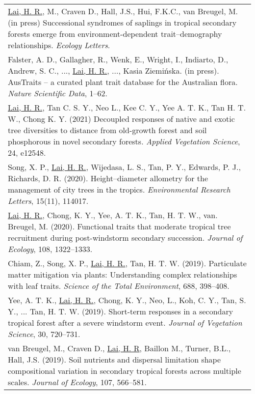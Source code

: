 \documentclass[a4paper]{article}
\begin{document}
\begin{tabular}{p{\linewidth}}

\hangindent=1cm \underline{Lai, H. R.}, M., Craven D., Hall, J.S., Hui, F.K.C., van Breugel, M. (in press) Successional syndromes of saplings in tropical secondary forests emerge from environment-dependent trait--demography relationships. \textit{Ecology Letters}. \\

\hangindent=1cm Falster, A. D., Gallagher, R., Wenk, E., Wright, I., Indiarto, D., Andrew, S. C., ..., \underline{Lai, H. R.}, ..., Kasia Ziemińska. (in press). AusTraits -- a curated plant trait database for the Australian flora. \textit{Nature Scientific Data}, 1–62. \\

\hangindent=1cm \underline{Lai, H. R.}, Tan C. S. Y., Neo L., Kee C. Y., Yee A. T. K., Tan H. T. W., Chong K. Y. (2021) Decoupled responses of native and exotic tree diversities to distance from old-growth forest and soil phosphorous in novel secondary forests. \textit{Applied Vegetation Science}, 24, e12548. \\

\hangindent=1cm Song, X. P., \underline{Lai, H. R.}, Wijedasa, L. S., Tan, P. Y., Edwards, P. J., Richards, D. R. (2020). Height--diameter allometry for the management of city trees in the tropics. \textit{Environmental Research Letters}, 15(11), 114017. \\

\hangindent=1cm \underline{Lai, H. R.}, Chong, K. Y., Yee, A. T. K., Tan, H. T. W., van. Breugel, M. (2020). Functional traits that moderate tropical tree recruitment during post-windstorm secondary succession. \textit{Journal of Ecology}, 108, 1322--1333. \\

\hangindent=1cm Chiam, Z., Song, X. P., \underline{Lai, H. R.}, Tan, H. T. W. (2019). Particulate matter mitigation via plants: Understanding complex relationships with leaf traits. \textit{Science of the Total Environment}, 688, 398--408.\\

\hangindent=1cm Yee, A. T. K., \underline{Lai, H. R.}, Chong, K. Y., Neo, L., Koh, C. Y., Tan, S. Y., ... Tan, H. T. W. (2019). Short-term responses in a secondary tropical forest after a severe windstorm event. \textit{Journal of Vegetation Science}, 30, 720--731. \\

\hangindent=1cm van Breugel, M., Craven D., \underline{Lai, H. R}, Baillon M., Turner, B.L., Hall, J.S. (2019). Soil nutrients and dispersal limitation shape compositional variation in secondary tropical forests across multiple scales. \textit{Journal of Ecology}, 107, 566--581. \\


\end{tabular}
\end{document}
